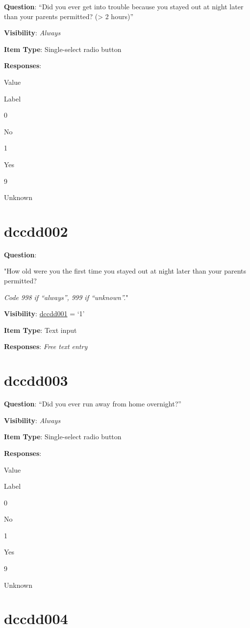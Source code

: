 \documentclass[]{book}
\begin{document}
\textbf{Question}: ``Did you ever get into trouble because you stayed out at night later than your parents permitted? (\textgreater{} 2 hours)''

\textbf{Visibility}: \emph{Always}

\textbf{Item Type}: Single-select radio button

\textbf{Responses}:

Value

Label

0

No

1

Yes

9

Unknown

\hypertarget{dccdd002}{%
\section{dccdd002}\label{dccdd002}}

\textbf{Question}:

"How old were you the first time you stayed out at night later than your parents permitted?

\emph{Code 998 if ``always'', 999 if ``unknown''.}"

\textbf{Visibility}: \protect\hyperlink{dccdd001}{dccdd001} = `1'

\textbf{Item Type}: Text input

\textbf{Responses}: \emph{Free text entry}

\hypertarget{dccdd003}{%
\section{dccdd003}\label{dccdd003}}

\textbf{Question}: ``Did you ever run away from home overnight?''

\textbf{Visibility}: \emph{Always}

\textbf{Item Type}: Single-select radio button

\textbf{Responses}:

Value

Label

0

No

1

Yes

9

Unknown

\hypertarget{dccdd004}{%
\section{dccdd004}\label{dccdd004}}
\end{document}
